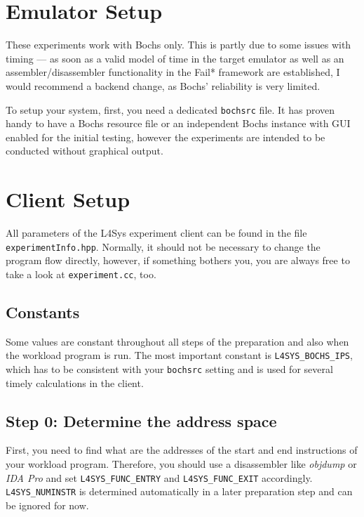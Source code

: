 \documentclass[a4paper,10pt]{article}
\begin{document}
\section{Emulator Setup}

These experiments work with Bochs only. This is partly due to some
issues with timing --- as soon as a valid model of
time in the target emulator as well as an assembler/disassembler
functionality in the Fail* framework are established, I would recommend a
backend change, as Bochs' reliability is very limited.

To setup your system, first, you need a dedicated \texttt{bochsrc} file.
It has proven handy to have
a Bochs resource file or an independent Bochs instance with GUI enabled
for the initial testing, however the experiments are intended to be
conducted without graphical output.

\section{Client Setup}

All parameters of the L4Sys experiment client can be found
in the file \texttt{experimentInfo.hpp}. Normally, it should
not be necessary to change the program flow directly, however,
if something bothers you, you are always free to take a look
at \texttt{experiment.cc}, too.

\subsection{Constants}

Some values are constant throughout all steps of the preparation
and also when the workload program is run.
The most important constant is \verb+L4SYS_BOCHS_IPS+,
which has to be consistent with your \texttt{bochsrc} setting
and is used for several timely calculations in the client.

\subsection{Step 0: Determine the address space}

First, you need to find what are the addresses of the
start and end instructions of your
workload program. Therefore, you should use a
disassembler like \emph{objdump} or \emph{IDA Pro} and
set \verb+L4SYS_FUNC_ENTRY+ and \verb+L4SYS_FUNC_EXIT+
accordingly. \verb+L4SYS_NUMINSTR+
is determined automatically in a later preparation step and
can be ignored for now.
\end{document}
